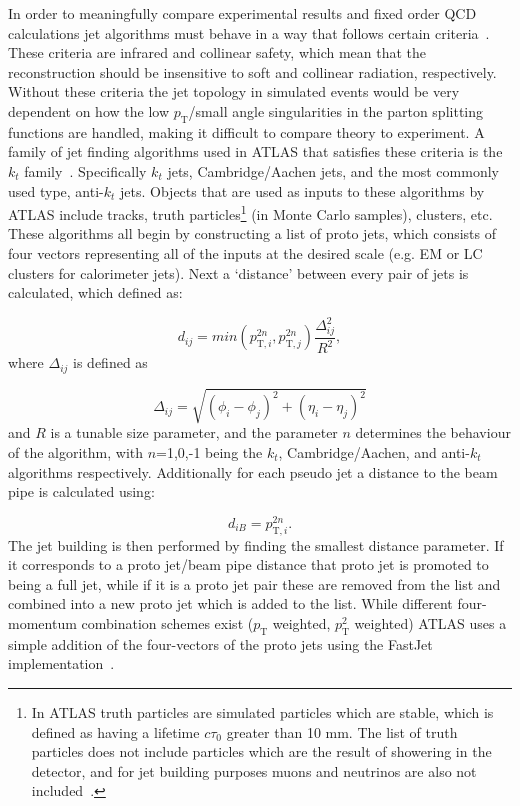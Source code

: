 In order to meaningfully compare experimental results and fixed order QCD calculations jet algorithms must behave in a way that follows certain criteria~\cite{Blazey:2000qt}.  
These criteria are infrared and collinear safety, which mean that the reconstruction should be insensitive to soft and collinear radiation, respectively.  
Without these criteria the jet topology in simulated events would be very dependent on how the low $p_{\mathrm T}$/small angle singularities in the parton splitting functions are handled, making it difficult to compare theory to experiment.  
A family of jet finding algorithms used in ATLAS that satisfies these criteria is the $k_t$ family~\cite{Cacciari:2008gp}.  
Specifically $k_t$ jets, Cambridge/Aachen jets, and the most commonly used type, anti-$k_t$ jets.  
Objects that are used as inputs to these algorithms by ATLAS include tracks, truth particles\footnote{In ATLAS truth particles are simulated particles which are stable, which is defined as having a lifetime $c\tau _{\mathrm 0}$ greater than 10 mm.  The list of truth particles does not include particles which are the result of showering in the detector, and for jet building purposes muons and neutrinos are also not included~\cite{ATL-PHYS-PUB-2015-013}.}  (in Monte Carlo samples), clusters, etc.  
These algorithms all begin by constructing a list of proto jets, which consists of four vectors representing all of the inputs at the desired scale (e.g. EM or LC clusters for calorimeter jets).  
Next a `distance' between every pair of jets is calculated, which defined as:

\begin{equation}
  d_{ij}=min\left(p_{\mathrm T,i}^{2n}, p_{\mathrm T,j}^{2n}\right)\frac{\Delta_{ij}^2}{R^2}, 
\end{equation}
\noindent
where $\Delta_{ij}$ is defined as 

\begin{equation}
  \Delta_{ij} = \sqrt{ \left(\phi_i-\phi_j\right)^2+\left(\eta_i-\eta_j\right)^2}
\end{equation}
\noindent
and $R$ is a tunable size parameter, and the parameter $n$ determines the behaviour of the algorithm, with $n$=1,0,-1 being the $k_t$, Cambridge/Aachen, and anti-$k_t$ algorithms respectively.  
Additionally for each pseudo jet a distance to the beam pipe is calculated using:

\begin{equation}
  d_{iB} = p_{\mathrm T,i}^{2n}.
\end{equation}  
\noindent
The jet building is then performed by finding the smallest distance parameter.  
If it corresponds to a proto jet/beam pipe distance that proto jet is promoted to being a full jet, while if it is a proto jet pair these are removed from the list and combined into a new proto jet which is added to the list.  
While different four-momentum combination schemes exist ($p_{\mathrm T}$ weighted, $p_{\mathrm T}^2$ weighted) ATLAS uses a simple addition of the four-vectors of the proto jets using the FastJet implementation~\cite{Cacciari:2011ma}.  

